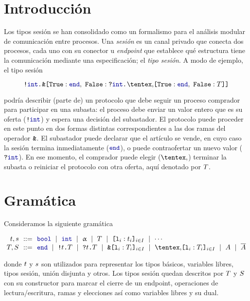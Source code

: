\section{Introducción}

Los tipos sesión se han consolidado como un formalismo para el
análisis modular de comunicación entre procesos. Una \emph{sesión} es un canal
privado que conecta dos procesos, cada uno con su conector u \emph{endpoint} que
establece qué estructura tiene la comunicación mediante una especificación; el
\emph{tipo sesión}. A modo de ejemplo, el tipo sesión

\begin{equation}
    \label{eq:bare.auction}
    \Out\tint{
        \BinaryPBranch[]\End{
            \In\tint{
                \BinaryPChoice[]\End\T
            }
        }
    }
\end{equation}

podría describir (parte de) un protocolo que debe seguir un proceso comprador
para participar en una subasta: el proceso debe enviar un valor entero que es su
oferta ($ \Out [] \tint $) y espera una decisión del subastador. El protocolo
puede proceder en este punto en dos formas distintas correspondientes a las dos
ramas del operador $\texttt{\upshape\&}$. El subastador puede declarar que el
artículo se vende, en cuyo caso la sesión termina inmediatamente ($ \End $), o
puede contraofertar un nuevo valor ($ \In [] \tint $). En ese momento, el
comprador puede elegir ($\Choice$) terminar la subasta o reiniciar
el protocolo con otra oferta, aquí denotado por $T$.

\section{Gramática}

Consideramos la siguiente gramática

\[
\begin{array}{@{}r@{~~}c@{~~}l@{}}
\TypeT, \TypeS & ::= &
\tbool
\rulemid \tint
\rulemid \tvar
\rulemid \SessionType
\rulemid \set[i\in I]{ \Tag_i : \Type_i }
\rulemid \cdots
\\
\SessionTypeT, \SessionTypeS & ::= &
\End
\rulemid \Out\Type\SessionType
\rulemid \In\Type\SessionType
\rulemid \Branch \set[i\in I]{\Tag_i : \SessionType_i}
\rulemid \Choice \set[i\in I]{\Tag_i : \SessionType_i}
\rulemid \etvar
\rulemid \dual\etvar
\end{array}
\]

donde $t$ y $s$ son utilizados para representar los tipos básicos,
variables libres, tipos sesión, unión disjunta y otros.
Los tipos sesión quedan descritos por $T$ y $S$ con su
constructor para marcar el cierre de un endpoint, operaciones de
lectura/escritura, ramas y elecciones así como variables libres y su dual.

